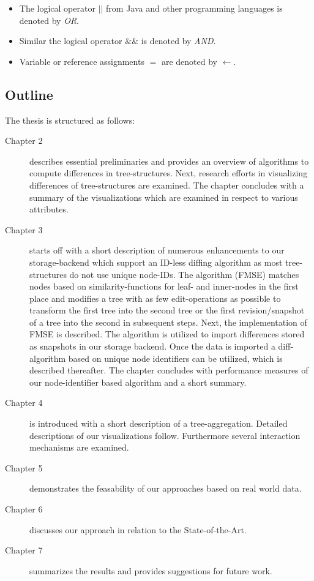 \begin{itemize}
\item The logical operator \emph{$||$} from Java and other programming languages is denoted by \emph{OR}.
\item Similar the logical operator \emph{$\&\&$} is denoted by \emph{AND}.
\item Variable or reference assignments \emph{$=$} are denoted by \emph{$\leftarrow$}.
\end{itemize}

\subsection{Outline}
The thesis is structured as follows:

\begin{description}
\item[Chapter 2] describes essential preliminaries and provides an overview of algorithms to compute differences in tree-structures. Next, research efforts in visualizing differences of tree-structures are examined. The chapter concludes with a summary of the visualizations which are examined in respect to various attributes.
\item[Chapter 3] starts off with a short description of numerous enhancements to our storage-backend which support an ID-less diffing algorithm as most tree-structures do not use unique node-IDs. The algorithm (FMSE) matches nodes based on similarity-functions for leaf- and inner-nodes in the first place and modifies a tree with as few edit-operations as possible to transform the first tree into the second tree or the first revision/snapshot of a tree into the second in subsequent steps. Next, the implementation of FMSE is described. The algorithm is utilized to import differences stored as snapshots in our storage backend. Once the data is imported a diff-algorithm based on unique node identifiers can be utilized, which is described thereafter. The chapter concludes with performance measures of our node-identifier based algorithm and a short summary.
\item[Chapter 4] is introduced with a short description of a tree-aggregation. Detailed descriptions of our visualizations follow. Furthermore several interaction mechanisms are examined.
\item[Chapter 5] demonstrates the feasability of our approaches based on real world data.
\item[Chapter 6] discusses our approach in relation to the State-of-the-Art.
\item[Chapter 7] summarizes the results and provides suggestions for future work.
\end{description}


